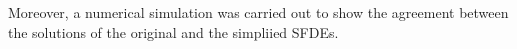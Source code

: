 \documentclass[a4 paper, 12pt]{report}
\theoremstyle{plain}
\begin{document}
\par Moreover, a numerical simulation was carried out to show the agreement between the solutions of the original and the simpliied SFDEs.

%
%
%
%
%
%
%
%
%
%
%
%
%
%
%
%
%
%
%
%
%
%
%
%
%
%
%
%
%
%
%
%
%
%
%

















\nocite{*}

\end{document}
